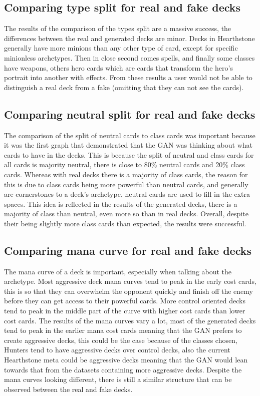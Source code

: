 \documentclass{report} %
\begin{document}
\subsection{Comparing type split for real and fake decks}
The results of the comparison of the types split are a massive success, the differences between the real and generated decks are minor. Decks in Hearthstone generally have more minions than any other type of card, except for specific minionless archetypes. Then in close second comes spells, and finally some classes have weapons, others hero cards which are cards that transform the hero's portrait into another with effects. From these results a user would not be able to distinguish a real deck from a fake (omitting that they can not see the cards).
\subsection{Comparing neutral split for real and fake decks}
The comparison of the split of neutral cards to class cards was important because it was the first graph that demonstrated that the GAN was thinking about what cards to have in the decks. This is because the split of neutral and class cards for all cards is majority neutral, there is close to 80\% neutral cards and 20\% class cards. Whereas with real decks there is a majority of class cards, the reason for this is due to class cards being more powerful than neutral cards, and generally are cornerstones to a deck's archetype, neutral cards are used to fill in the extra spaces. This idea is reflected in the results of the generated decks, there is a majority of class than neutral, even more so than in real decks. Overall, despite their being slightly more class cards than expected, the results were successful.
\subsection{Comparing mana curve for real and fake decks}
The mana curve of a deck is important, especially when talking about the archetype. Most aggressive deck mana curves tend to peak in the early cost cards, this is so that they can overwhelm the opponent quickly and finish off the enemy before they can get access to their powerful cards. More control oriented decks tend to peak in the middle part of the curve with higher cost cards than lower cost cards. The results of the mana curves vary a lot, most of the generated decks tend to peak in the earlier mana cost cards meaning that the GAN prefers to create aggressive decks, this could be the case because of the classes chosen, Hunters tend to have aggressive decks over control decks, also the current Hearthstone meta could be aggressive decks meaning that the GAN would lean towards that from the datasets containing more aggressive decks. Despite the mana curves looking different, there is still a similar structure that can be observed between the real and fake decks.
\end{document}
